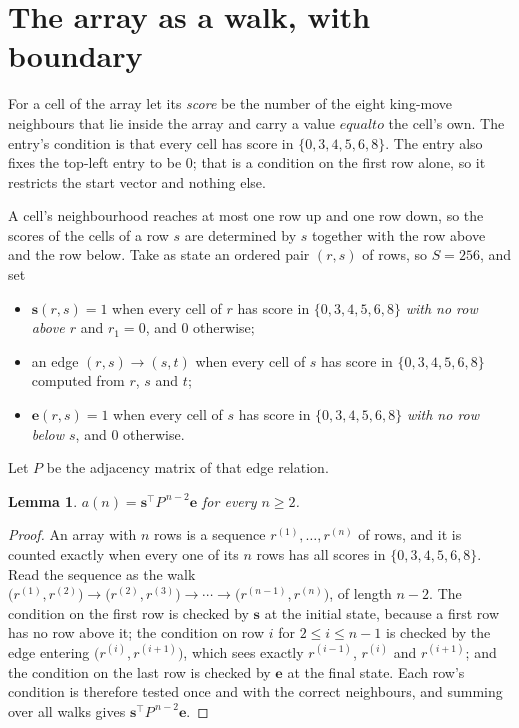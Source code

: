 \documentclass[11pt,a4paper]{article}
\theoremstyle{plain}
\newtheorem{lemma}[theorem]{Lemma}
\theoremstyle{definition}
\begin{document}
\section{The array as a walk, with boundary}

For a cell of the array let its \emph{score} be the number of the eight king-move neighbours that lie inside
the array and carry a value $equal to$ the cell's own. The entry's condition is that every cell
has score in $\{0,3,4,5,6,8\}$. The entry also fixes the top-left entry to be $0$; that is a condition on the first row alone, so it restricts the start vector and nothing else.

A cell's neighbourhood reaches at most one row up and one row down, so the scores of the
cells of a row $s$ are determined by $s$ together with the row above and the row below.
Take as state an ordered pair $(r,s)$ of rows, so $S=256$, and set
\begin{itemize}
\item $\mathbf{s}(r,s)=1$ when every cell of $r$ has score in $\{0,3,4,5,6,8\}$ \emph{with no row
above $r$} and $r_1=0$, and $0$ otherwise;
\item an edge $(r,s)\to(s,t)$ when every cell of $s$ has score in $\{0,3,4,5,6,8\}$ computed from
$r$, $s$ and $t$;
\item $\mathbf{e}(r,s)=1$ when every cell of $s$ has score in $\{0,3,4,5,6,8\}$ \emph{with no row
below $s$}, and $0$ otherwise.
\end{itemize}
Let $P$ be the adjacency matrix of that edge relation.

\begin{lemma}\label{lem:walk}
$a(n)=\mathbf{s}^{\!\top}P^{\,n-2}\mathbf{e}$ for every $n\ge2$.
\end{lemma}

\begin{proof}
An array with $n$ rows is a sequence $r^{(1)},\dots,r^{(n)}$ of rows, and it is counted
exactly when every one of its $n$ rows has all scores in $\{0,3,4,5,6,8\}$. Read the sequence as the
walk $\bigl(r^{(1)},r^{(2)}\bigr)\to\bigl(r^{(2)},r^{(3)}\bigr)\to\cdots\to
\bigl(r^{(n-1)},r^{(n)}\bigr)$, of length $n-2$. The condition on the first row is
checked by $\mathbf{s}$ at the initial state, because a first row has no row above it; the
condition on row $i$ for $2\le i\le n-1$ is checked by the edge entering
$\bigl(r^{(i)},r^{(i+1)}\bigr)$, which sees exactly $r^{(i-1)}$, $r^{(i)}$ and
$r^{(i+1)}$; and the condition on the last row is checked by $\mathbf{e}$ at the final
state. Each row's condition is therefore tested once and with the correct neighbours, and
summing over all walks gives $\mathbf{s}^{\!\top}P^{\,n-2}\mathbf{e}$.
\end{proof}
\end{document}
